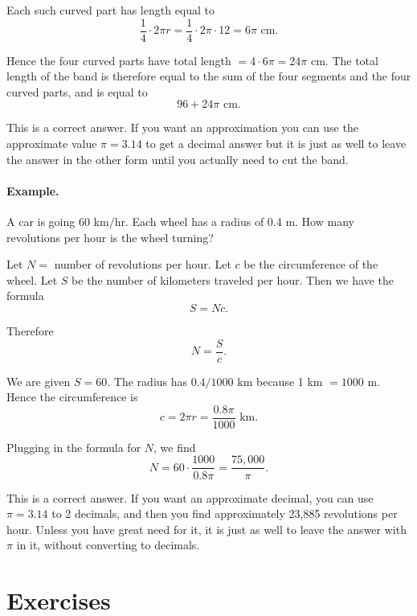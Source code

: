 \documentclass[12pt]{book} %
\begin{document}
Each such curved part has length equal to
\[
\frac14\cdot 2\pi r=\frac14\cdot 2\pi \cdot 12=6\pi\text{ cm.}
\]

Hence the four curved parts have total length $=4\cdot 6\pi=24\pi$ cm.
The total length of the band is therefore equal to the sum of the four segments and the four curved parts, and is equal to
\[
96+24\pi\text{ cm.}
\]

This is a correct answer. If you want an approximation you can use the approximate value $\pi=3.14$ to get a decimal answer but it is just as well to leave the answer in the other form until you actually need to cut the band.

\paragraph{Example.}
A car is going 60 km/hr. Each wheel has a radius of 0.4 m. How many revolutions per hour is the wheel turning?

Let $N=$ number of revolutions per hour. Let $c$ be the circumference of the wheel. Let $S$ be the number of kilometers traveled per hour.
Then we have the formula
\[
S=Nc.
\]

Therefore
\[
N=\frac{S}{c}.
\]

We are given $S=60$. The radius has $0.4/1000$ km because 1 km $=1000$ m. Hence the circumference is
\[
c=2\pi r=\frac{0.8\pi}{1000}\text{ km.}
\]

Plugging in the formula for $N$, we find
\[
N=60\cdot \frac{1000}{0.8\pi}=\frac{75,000}{\pi}.
\]

This is a correct answer. If you want an approximate decimal, you can use $\pi=3.14$ to 2 decimals, and then you find approximately 23,885 revolutions per hour. Unless you have great need for it, it is just as well to leave the answer with $\pi$ in it, without converting to decimals.

\section*{Exercises}
\end{document}
